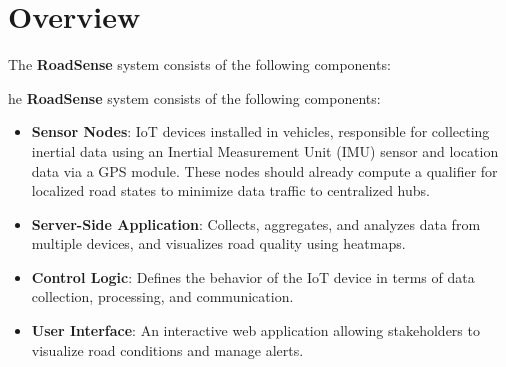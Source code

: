 \section{Overview}

The \textbf{RoadSense} system consists of the following components:

he \textbf{RoadSense} system consists of the following components:

\begin{itemize}
    \item \textbf{Sensor Nodes}: IoT devices installed in vehicles, responsible for collecting inertial data using an Inertial Measurement Unit (IMU) sensor and location data via a GPS module. These nodes should already compute a qualifier for localized road states to minimize data traffic to centralized hubs.
    \item \textbf{Server-Side Application}: Collects, aggregates, and analyzes data from multiple devices, and visualizes road quality using heatmaps.
    \item \textbf{Control Logic}: Defines the behavior of the IoT device in terms of data collection, processing, and communication.
    \item \textbf{User Interface}: An interactive web application allowing stakeholders to visualize road conditions and manage alerts.
\end{itemize}